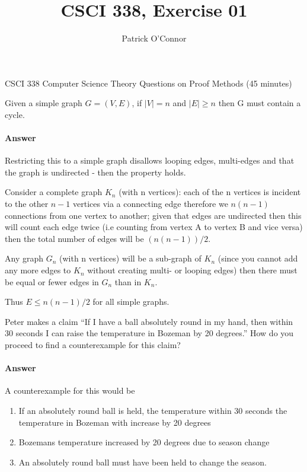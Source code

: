 \documentclass{article}
\title{CSCI 338, Exercise 01}
\author{Patrick O'Connor}
\begin{document}
\maketitle

CSCI 338 Computer Science Theory
Questions on Proof Methods (45 minutes)

Given a simple graph $G = (V,E)$, if $|V| = n$ and $|E| \geq n$ then G must contain a cycle.
\paragraph{Answer}
Restricting this to a simple graph disallows looping edges, multi-edges 
and that the graph is undirected - then the property holds.

Consider a complete graph $K_n$ (with n vertices): each of the n vertices is incident to the other
 $n-1$ vertices via a connecting edge therefore we $n(n-1)$ connections from one vertex to 
 another; given that edges are undirected then this will count each edge twice (i.e counting 
 from vertex A to vertex B and vice versa) then the total number of edges will be $(n(n-1))/2$.

Any graph $G_n$ (with n vertices) will be a sub-graph of $K_n$ (since you cannot add any more 
edges to $K_n$ without creating multi- or looping edges) then there must be equal or fewer 
edges in $G_n$ than in $K_n$.

Thus $E \leq n(n-1)/2$ for all simple graphs.

Peter makes a claim “If I have a ball absolutely round in my hand, then within 30
seconds I can raise the temperature in Bozeman by 20 degrees.” How do you proceed to
find a counterexample for this claim?
\paragraph{Answer}
A counterexample for this would be 
\begin{enumerate}
    \item If an absolutely round ball is held, the temperature within 30 seconds the temperature in Bozeman with increase by 20 degrees
    \item Bozemans temperature increased by 20 degrees due to season change
    \item An absolutely round ball must have been held to change the season.
\end{enumerate}
\end{document}
